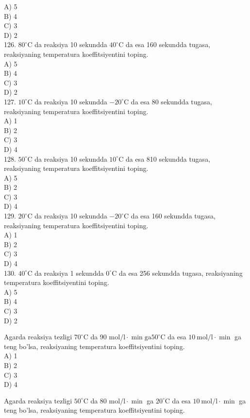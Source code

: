 A) 5\\
B) 4\\
C) 3\\
D) 2\\
126. $80^{\circ} \mathrm{C}$ da reaksiya 10 sekundda $40^{\circ} \mathrm{C}$ da esa 160 sekundda tugasa, reaksiyaning temperatura koeffitsiyentini toping.\\
A) 5\\
B) 4\\
C) 3\\
D) 2\\
127. $10^{\circ} \mathrm{C}$ da reaksiya 10 sekundda $-20^{\circ} \mathrm{C}$ da esa 80 sekundda tugasa, reaksiyaning temperatura koeffitsiyentini toping.\\
A) 1\\
B) 2\\
C) 3\\
D) 4\\
128. $50^{\circ} \mathrm{C}$ da reaksiya 10 sekundda $10^{\circ} \mathrm{C}$ da esa 810 sekundda tugasa, reaksiyaning temperatura koeffitsiyentini toping.\\
A) 5\\
B) 2\\
C) 3\\
D) 4\\
129. $20^{\circ} \mathrm{C}$ da reaksiya 10 sekundda $-20^{\circ} \mathrm{C}$ da esa 160 sekundda tugasa, reaksiyaning temperatura koeffitsiyentini toping.\\
A) 1\\
B) 2\\
C) 3\\
D) 4\\
130. $40^{\circ} \mathrm{C}$ da reaksiya 1 sekundda $0^{\circ} \mathrm{C}$ da esa 256 sekundda tugasa, reaksiyaning temperatura koeffitsiyentini toping.\\
A) 5\\
B) 4\\
C) 3\\
D) 2
  \item Agarda reaksiya tezligi $70^{\circ} \mathrm{C}$ da 90 $\mathrm{mol} / \mathrm{l} \cdot \min \mathrm{ga} 50^{\circ} \mathrm{C}$ da esa $10 \mathrm{~mol} / \mathrm{l} \cdot \min$ ga teng bo'lsa, reaksiyaning temperatura koeffitsiyentini toping.\\
A) 1\\
B) 2\\
C) 3\\
D) 4\\
  \item Agarda reaksiya tezligi $50^{\circ} \mathrm{C}$ da 80 $\mathrm{mol} / \mathrm{l} \cdot \min$ ga $20^{\circ} \mathrm{C}$ da esa $10 \mathrm{~mol} / \mathrm{l} \cdot \min$ ga teng bo'lsa, reaksiyaning temperatura koeffitsiyentini toping.\\
